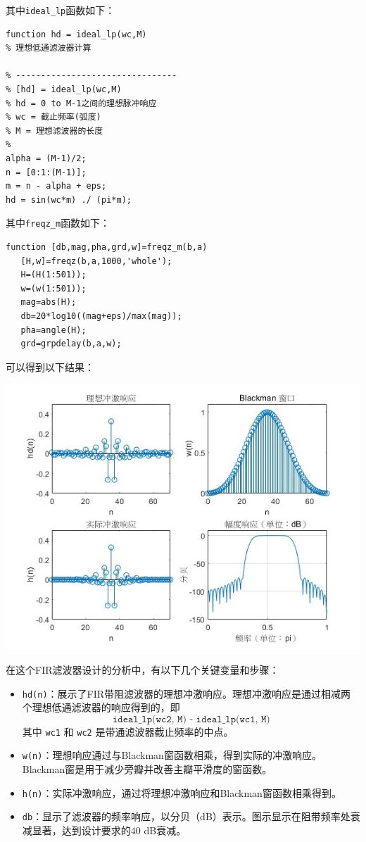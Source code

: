 \documentclass[a4paper,12pt]{article}
\begin{document}
其中\texttt{ideal\_lp}函数如下：
\begin{lstlisting}
function hd = ideal_lp(wc,M)
% 理想低通滤波器计算
 
% -------------------------------- 
% [hd] = ideal_lp(wc,M)  
% hd = 0 to M-1之间的理想脉冲响应
% wc = 截止频率(弧度) 
% M = 理想滤波器的长度
% 
alpha = (M-1)/2; 
n = [0:1:(M-1)]; 
m = n - alpha + eps; 
hd = sin(wc*m) ./ (pi*m);
\end{lstlisting}

其中\texttt{freqz\_m}函数如下：
\begin{lstlisting}
function [db,mag,pha,grd,w]=freqz_m(b,a)
   [H,w]=freqz(b,a,1000,'whole');
   H=(H(1:501));
   w=(w(1:501));
   mag=abs(H);
   db=20*log10((mag+eps)/max(mag));
   pha=angle(H);
   grd=grpdelay(b,a,w);
\end{lstlisting}

可以得到以下结果：

\centering 
\includegraphics[width=0.8\linewidth]{images/4_Verify/fir.jpg}
\justifying

在这个FIR滤波器设计的分析中，有以下几个关键变量和步骤：

\begin{itemize}
  \item \texttt{hd(n)}：展示了FIR带阻滤波器的理想冲激响应。理想冲激响应是通过相减两个理想低通滤波器的响应得到的，即
  \[
  \texttt{ideal\_lp(wc2, M) - ideal\_lp(wc1, M)}
  \]
  其中 \texttt{wc1} 和 \texttt{wc2} 是带通滤波器截止频率的中点。

  \item \texttt{w(n)}：理想响应通过与Blackman窗函数相乘，得到实际的冲激响应。Blackman窗是用于减少旁瓣并改善主瓣平滑度的窗函数。

  \item \texttt{h(n)}：实际冲激响应，通过将理想冲激响应和Blackman窗函数相乘得到。

  \item \texttt{db}：显示了滤波器的频率响应，以分贝（dB）表示。图示显示在阻带频率处衰减显著，达到设计要求的40 dB衰减。
\end{itemize}
\end{document}
